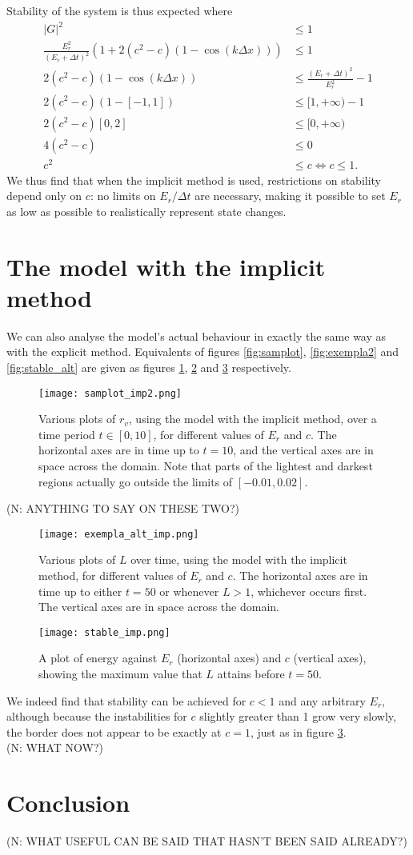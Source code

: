 \documentclass[11pt]{article}
\begin{document}
Stability of the system is thus expected where
\begin{align*}
|G|^2 &\leq 1 \\
\frac{E_r^2}{\left(E_r+\Delta t\right)^2}\left(1 + 2(c^2-c)\left(1 - \cos\left(k\Delta x\right)\right)\right) &\leq 1 \\
2(c^2-c)\left(1 - \cos\left(k\Delta x\right)\right) &\leq \frac{\left(E_r+\Delta t\right)^2}{E_r^2} - 1 \\
2(c^2-c)\left(1 - [-1,1]\right) &\leq [1,+\infty) - 1 \\
2(c^2-c)[0,2] &\leq [0,+\infty) \\
4\left(c^2 - c\right) &\leq 0 \\
c^2 &\leq c \Leftrightarrow c \leq 1.
\end{align*}
We thus find that when the implicit method is used, restrictions on stability depend only on $c$: no limits on $E_r/\Delta t$ are necessary, making it possible to set $E_r$ as low as possible to realistically represent state changes.

\section{The model with the implicit method}
We can also analyse the model's actual behaviour in exactly the same way as with the explicit method. Equivalents of figures \ref{fig:samplot}, \ref{fig:exempla2} and \ref{fig:stable_alt} are given as figures \ref{fig:samplot_imp2}, \ref{fig:exempla_alt_imp} and \ref{fig:stable_imp} respectively.
\begin{figure}[H]
\centering
\texttt{[image: samplot\_imp2.png]}
\caption{Various plots of $r_v$, using the model with the implicit method, over a time period $t\in[0,10]$, for different values of $E_r$ and $c$. The horizontal axes are in time up to $t=10$, and the vertical axes are in space across the domain. Note that parts of the lightest and darkest regions actually go outside the limits of $[-0.01,0.02]$.}
\label{fig:samplot_imp2}
\end{figure}
(N: ANYTHING TO SAY ON THESE TWO?)
\begin{figure}[H]
\centering
\texttt{[image: exempla\_alt\_imp.png]}
\caption{Various plots of $L$ over time, using the model with the implicit method, for different values of $E_r$ and $c$. The horizontal axes are in time up to either $t=50$ or whenever $L>1$, whichever occurs first. The vertical axes are in space across the domain.}
\label{fig:exempla_alt_imp}
\end{figure}
\begin{figure}[H]
\centering
\texttt{[image: stable\_imp.png]}
\caption{A plot of energy against $E_r$ (horizontal axes) and $c$ (vertical axes), showing the maximum value that $L$ attains before $t=50$.}
\label{fig:stable_imp}
\end{figure}
We indeed find that stability can be achieved for $c<1$ and any arbitrary $E_r$, although because the instabilities for $c$ slightly greater than 1 grow very slowly, the border does not appear to be exactly at $c=1$, just as in figure \ref{fig:stable_imp}. \\
(N: WHAT NOW?)

\section{Conclusion}
(N: WHAT USEFUL CAN BE SAID THAT HASN'T BEEN SAID ALREADY?)

\newpage


\end{document}
